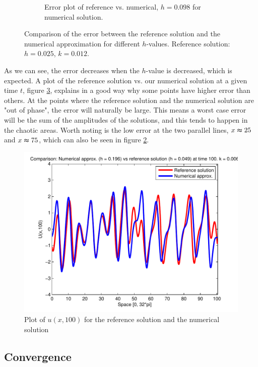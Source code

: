 \begin{figure}[H]
\begin{subfigure}[b]{0.52\textwidth}
                \caption{Error plot of reference vs. numerical, $h = 0.098$ for numerical solution.}
                \label{fig:lowError}
        \end{subfigure}
        \caption{Comparison of the error between the reference solution and the numerical approximation for different $h$-values. Reference solution: $h = 0.025$, $k = 0.012$.}\label{fig:errPlots}
\end{figure}

As we can see, the error decreases when the $h$-value is decreased, which is expected. A plot of the reference solution vs. our numerical solution at a given time $t$, figure \ref{fig:errTime}, explains in a good way why some points have higher error than others. At the points where the reference solution and the numerical solution are "out of phase", the error will naturally be large. This means a worst case error will be the sum of the amplitudes of the solutions, and this tends to happen in the chaotic areas. Worth noting is the low error at the two parallel lines, $x \thickapprox 25$ and $x \thickapprox 75$, which can also be seen in figure \ref{fig:errPlots}. 

\begin{figure}[H]
\centering
\includegraphics[scale=0.55]
{../PDFs/IMEX/comp_num_ref_t100.pdf}
\caption{Plot of $u(x,100)$ for the reference solution and the numerical solution}
\label{fig:errTime}
\end{figure}

\subsection{Convergence}

